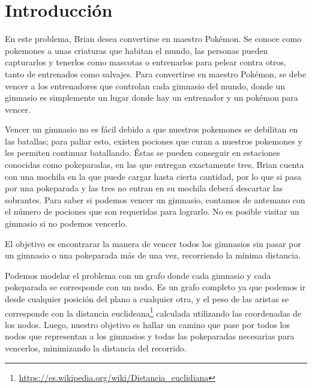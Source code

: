 \section{Introducción}

En este problema, Brian desea convertirse en maestro Pokémon. Se conoce como pokemones a unas criaturas que habitan el mundo, las personas pueden capturarlos y tenerlos como mascotas o entrenarlos para pelear contra otros, tanto de entrenados como salvajes. Para convertirse en maestro Pokémon, se debe vencer a los entrenadores que controlan cada gimnasio del mundo, donde un gimnasio es simplemente un lugar donde hay un entrenador y un pok\'emon para vencer.

Vencer un gimnasio no es fácil debido a que nuestros pokemones se debilitan en las batallas; para paliar esto, existen pociones que curan a nuestros pokemones y les permiten continuar batallando. \'Estas se pueden conseguir en estaciones conocidas como pokeparadas, en las que entregan exactamente tres. Brian cuenta con una mochila en la que puede cargar hasta cierta cantidad, por lo que si pasa por una pokeparada y las tres no entran en su mochila deberá descartar las sobrantes. Para saber si podemos vencer un gimnasio, contamos de antemano con el número de pociones que son requeridas para lograrlo. No es posible visitar un gimnasio si no podemos vencerlo.

El objetivo es encontrarar la manera de vencer todos los gimnasios sin pasar por un gimnasio o una pokeparada más de una vez, recorriendo la mínima distancia.

Podemos modelar el problema con un grafo donde cada gimnasio y cada pokeparada se corresponde con un nodo. Es un grafo completo ya que podemos ir desde cualquier posici\'on del plano a cualquier otra, y el peso de las aristas se corresponde con la distancia euclideana\footnote{\url{https://es.wikipedia.org/wiki/Distancia_euclidiana}} calculada utilizando las coordenadas de los nodos. Luego, nuestro objetivo es hallar un camino que pase por todos los nodos que representan a los gimnasios y todas las pokeparadas necesarias para vencerlos, minimizando la distancia del recorrido.


